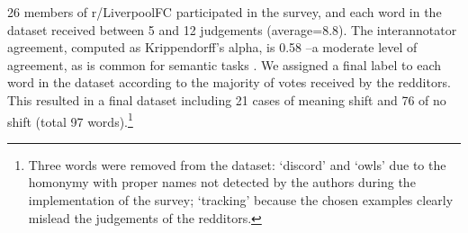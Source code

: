 26 members of r/LiverpoolFC participated in the survey, and
each word in the dataset received between 5 and 12 judgements
(average=8.8). The interannotator agreement, computed as
Krippendorff's alpha, is
0.58 --a moderate level of
agreement, as is common for semantic tasks \cite{artstein2008inter}. We assigned a
final label to each word in the dataset according to the majority of
votes received by the redditors. This resulted in a final dataset
including 21 cases of meaning shift and 76 of no shift (total 97
words).\footnote{Three words were removed from the dataset: `discord'
  and `owls' due to the homonymy with proper names not detected by the
  authors during the implementation of the survey; `tracking' because
  the chosen examples clearly mislead the judgements of the
  redditors.}

%

